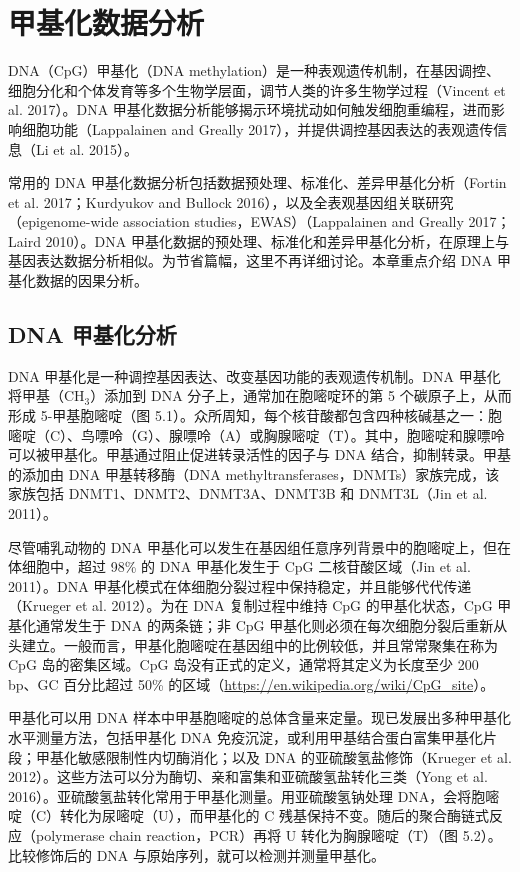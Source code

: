 \chapter{甲基化数据分析}
\label{ch:methylation}

DNA（CpG）甲基化（DNA methylation）是一种表观遗传机制，在基因调控、细胞分化和个体发育等多个生物学层面，调节人类的许多生物学过程（Vincent et al. 2017）。DNA 甲基化数据分析能够揭示环境扰动如何触发细胞重编程，进而影响细胞功能（Lappalainen and Greally 2017），并提供调控基因表达的表观遗传信息（Li et al. 2015）。

常用的 DNA 甲基化数据分析包括数据预处理、标准化、差异甲基化分析（Fortin et al. 2017；Kurdyukov and Bullock 2016），以及全表观基因组关联研究（epigenome-wide association studies，EWAS）（Lappalainen and Greally 2017；Laird 2010）。DNA 甲基化数据的预处理、标准化和差异甲基化分析，在原理上与基因表达数据分析相似。为节省篇幅，这里不再详细讨论。本章重点介绍 DNA 甲基化数据的因果分析。

\section{DNA 甲基化分析}

DNA 甲基化是一种调控基因表达、改变基因功能的表观遗传机制。DNA 甲基化将甲基（$\mathrm{CH}_3$）添加到 DNA 分子上，通常加在胞嘧啶环的第 5 个碳原子上，从而形成 5-甲基胞嘧啶（图 5.1）。众所周知，每个核苷酸都包含四种核碱基之一：胞嘧啶（C）、鸟嘌呤（G）、腺嘌呤（A）或胸腺嘧啶（T）。其中，胞嘧啶和腺嘌呤可以被甲基化。甲基通过阻止促进转录活性的因子与 DNA 结合，抑制转录。甲基的添加由 DNA 甲基转移酶（DNA methyltransferases，DNMTs）家族完成，该家族包括 DNMT1、DNMT2、DNMT3A、DNMT3B 和 DNMT3L（Jin et al. 2011）。



尽管哺乳动物的 DNA 甲基化可以发生在基因组任意序列背景中的胞嘧啶上，但在体细胞中，超过 98\% 的 DNA 甲基化发生于 CpG 二核苷酸区域（Jin et al. 2011）。DNA 甲基化模式在体细胞分裂过程中保持稳定，并且能够代代传递（Krueger et al. 2012）。为在 DNA 复制过程中维持 CpG 的甲基化状态，CpG 甲基化通常发生于 DNA 的两条链；非 CpG 甲基化则必须在每次细胞分裂后重新从头建立。一般而言，甲基化胞嘧啶在基因组中的比例较低，并且常常聚集在称为 CpG 岛的密集区域。CpG 岛没有正式的定义，通常将其定义为长度至少 200 bp、GC 百分比超过 50\% 的区域（\url{https://en.wikipedia.org/wiki/CpG_site}）。

甲基化可以用 DNA 样本中甲基胞嘧啶的总体含量来定量。现已发展出多种甲基化水平测量方法，包括甲基化 DNA 免疫沉淀，或利用甲基结合蛋白富集甲基化片段；甲基化敏感限制性内切酶消化；以及 DNA 的亚硫酸氢盐修饰（Krueger et al. 2012）。这些方法可以分为酶切、亲和富集和亚硫酸氢盐转化三类（Yong et al. 2016）。亚硫酸氢盐转化常用于甲基化测量。用亚硫酸氢钠处理 DNA，会将胞嘧啶（C）转化为尿嘧啶（U），而甲基化的 C 残基保持不变。随后的聚合酶链式反应（polymerase chain reaction，PCR）再将 U 转化为胸腺嘧啶（T）（图 5.2）。比较修饰后的 DNA 与原始序列，就可以检测并测量甲基化。

